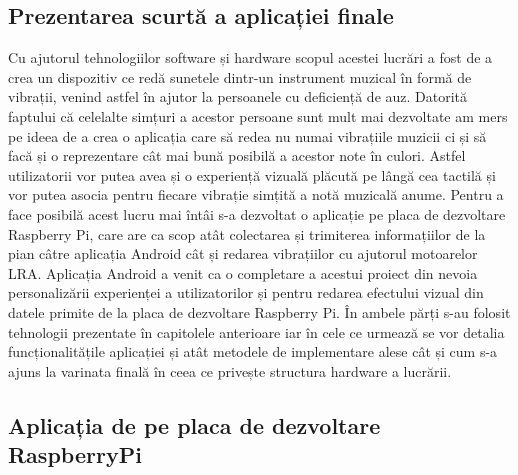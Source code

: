 \documentclass[../IoMusT.tex]{subfiles}
\begin{document}
\subsection{Prezentarea scurtă a aplicației finale}
Cu ajutorul tehnologiilor software și hardware scopul acestei lucrări a fost de a crea un dispozitiv ce redă sunetele dintr-un instrument muzical în formă de vibrații, venind astfel în ajutor la persoanele cu deficiență de auz. Datorită faptului că celelalte simțuri a acestor persoane sunt mult mai dezvoltate am mers pe ideea de a crea o aplicația care să redea nu numai vibrațiile muzicii ci și să facă și o reprezentare cât mai bună posibilă a acestor note în culori. Astfel utilizatorii vor putea avea și o experiență vizuală plăcută pe lângă cea tactilă și vor putea asocia pentru fiecare vibrație simțită a notă muzicală anume. Pentru a face posibilă acest lucru mai întâi s-a dezvoltat o aplicație pe placa de dezvoltare Raspberry Pi, care are ca scop atât colectarea și trimiterea informațiilor de la pian câtre aplicația Android cât și redarea vibrațiilor cu ajutorul motoarelor LRA. Aplicația Android a venit ca o completare a acestui proiect din nevoia personalizării experienței a utilizatorilor și pentru redarea efectului vizual din datele primite de la placa de dezvoltare Raspberry Pi. În ambele părți s-au folosit tehnologii prezentate în capitolele anterioare iar în cele ce urmează se vor detalia funcționalitățile aplicației și atât metodele de implementare alese cât și cum s-a ajuns la varinata finală în ceea ce privește structura hardware a lucrării.
\subsection{Aplicația de pe placa de dezvoltare RaspberryPi}
\end{document}
